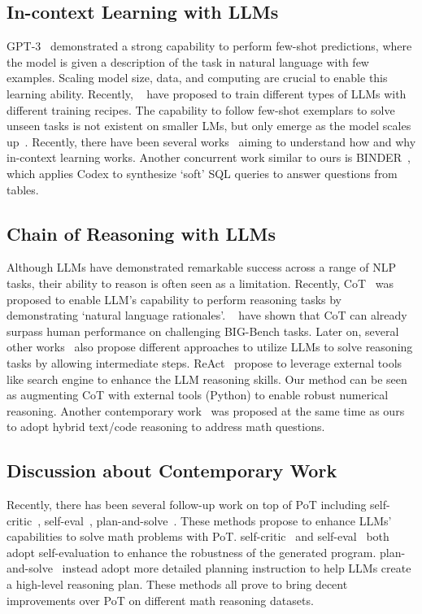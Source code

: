 \subsection{In-context Learning with LLMs} GPT-3~\citep{brown2020language} demonstrated a strong capability to perform few-shot predictions, where the model is given a description of the task in natural language with few examples. Scaling model size, data, and computing are crucial to enable this learning ability. Recently, ~\cite{rae2021scaling, smith2022using, chowdhery2022palm, du2022glam} have proposed to train different types of LLMs with different training recipes. The capability to follow few-shot exemplars to solve unseen tasks is not existent on smaller LMs, but only emerge as the model scales up~\citep{kaplan2020scaling}. Recently, there have been several works~\citep{xie2021explanation,min2022rethinking} aiming to understand how and why in-context learning works. Another concurrent work similar to ours is BINDER~\citep{cheng2022binding}, which applies Codex to synthesize `soft' SQL queries to answer questions from tables. 

\subsection{Chain of Reasoning with LLMs} Although LLMs have demonstrated remarkable success across a range of NLP tasks, their ability to reason is often seen as a limitation. Recently, CoT~\citep{wei2022chain,kojima2022large,wang2022self} was proposed to enable LLM's capability to perform reasoning tasks by demonstrating `natural language rationales'. ~\citet{suzgun2022challenging} have shown that CoT can already surpass human performance on challenging BIG-Bench tasks. Later on, several other works~\citep{drozdov2022compositional,zhou2022least,nye2021show} also propose different approaches to utilize LLMs to solve reasoning tasks by allowing intermediate steps. ReAct~\cite{yao2022react} propose to leverage external tools like search engine to enhance the LLM reasoning skills. Our method can be seen as augmenting CoT with external tools (Python) to enable robust numerical reasoning. Another contemporary work~\citep{gao2022pal} was proposed at the same time as ours to adopt hybrid text/code reasoning to address math questions. 

\subsection{Discussion about Contemporary Work} Recently, there has been several follow-up work on top of PoT including self-critic~\citep{gou2023critic}, self-eval~\citep{xie2023decomposition}, plan-and-solve~\citep{wang2023plan}. These methods propose to enhance LLMs' capabilities to solve math problems with PoT. self-critic~\citep{gou2023critic} and self-eval~\citep{xie2021explanation} both adopt self-evaluation to enhance the robustness of the generated program. plan-and-solve~\citep{wang2023plan} instead adopt more detailed planning instruction to help LLMs create a high-level reasoning plan. These methods all prove to bring decent improvements over PoT on different math reasoning datasets.   

